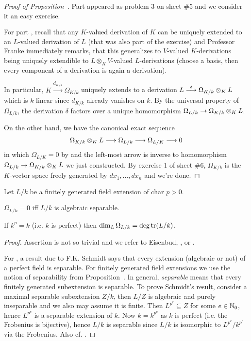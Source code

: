 \documentclass[a4paper,parskip=half,numbers=enddot, DIV=12]{scrreprt}
\begin{document}
\begin{proof}[Proof of Proposition~]
	Part  appeared as problem 3 on sheet \#5 and we consider it an easy exercise.
	
	For part , recall that any $K$-valued derivation of $K$ can be uniquely extended to an $L$-valued derivation of $L$ (that was also part of the exercise) and Professor Franke immediately remarks, that this generalizes to $V$-valued $K$-derivations being uniquely extendible to $L\otimes_KV$-valued $L$-derivations (choose a basis, then every component of a derivation is again a derivation). 
	
	In particular, $K\xrightarrow{d_{K/k}}\Omega_{K/k}$ uniquely extends to a derivation $L\morphism[\delta]\Omega_{K/k}\otimes_KL$ which is $k$-linear since $d_{K/k}$ already vanishes on $k$. By the universal property of $\Omega_{L/k}$, the derivation $\delta$ factors over a unique homomorphism $\Omega_{L/k}\morphism\Omega_{K/k}\otimes_K L$.
	
	On the other hand, we have the canonical exact sequence
	\begin{align*}
		\Omega_{K/k}\otimes_KL\morphism\Omega_{L/k}\morphism\Omega_{L/K}\morphism 0
	\end{align*}
	in which $\Omega_{L/K}=0$ by  and the left-most arrow is inverse to homomorphism $\Omega_{L/k}\morphism\Omega_{K/k}\otimes_K L$ we just constructed. By exercise 1 of sheet \#6, $\Omega_{K/k}$ is the $K$-vector space freely generated by $dx_1,\ldots,dx_n$ and we're done.
\end{proof}
\begin{prop}
    Let $L/k$ be a finitely generated field extension of char $p>0$. 
    \begin{alphanumerate}
      \item 
        $\Omega_{L/k} =0$ iff $L/k$ is algebraic separable.
      \item 
        If $k^p =k$ (i.e. $k$ is perfect) then $\dim_L\Omega_{L/k} = \deg\operatorname{tr}(L/k)$.
    \end{alphanumerate}
\end{prop}
\begin{proof}
	Assertion  is not so trivial and we refer to Eisenbud, \cite[Corollary~16.17]{eisenbudCommAlg}, or \cite[Proposition~5.6]{kunzKahler}.
	
	For , a result due to F.K. Schmidt says that every extension (algebraic or not) of a perfect field is separable. For finitely generated field extensions we use the notion of separability from Proposition~. In general, \emph{separable} means that every finitely generated subextension is separable. To prove Schmidt's result, consider a maximal separable subextension $Z/k$, then $L/Z$ is algebraic and purely inseparable and we also may assume it is finite. Then $L^{p^e}\subseteq Z$ for some $e\in\mathbb{N}_0$, hence $L^{p^e}$ is a separable extension of $k$. Now $k=k^{p^e}$ as $k$ is perfect (i.e. the Frobenius is bijective), hence $L/k$ is separable since $L/k$ is isomorphic to $L^{p^e}/k^{p^e}$ via the Frobenius. Also cf. \cite[Proposition~5.18]{kunzKahler}.
\end{proof}
\end{document}
